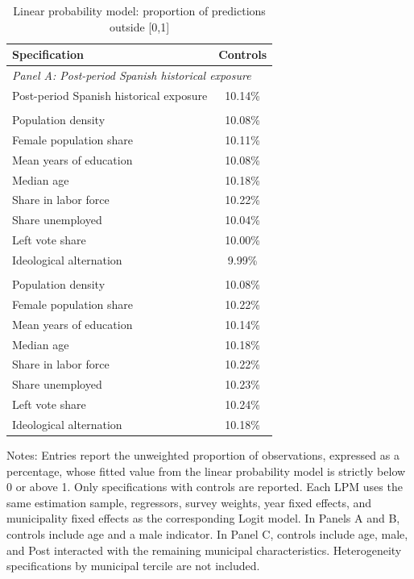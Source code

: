 \begin{table}[!htbp]
\normalsize
\renewcommand{\arraystretch}{1.15}
\centering
\caption{Linear probability model: proportion of predictions outside [0,1]}
\label{tab:lpm_outside_all}
\begin{tabular}{lc}
\hline
Specification & Controls \\
\hline
\multicolumn{2}{l}{\textit{Panel A: Post-period Spanish historical exposure}} \\
Post-period Spanish historical exposure & 10.14\% \\
\addlinespace
\multicolumn{2}{l}{\textit{Panel B: Post-period municipal characteristics}} \\
Population density & 10.08\% \\
Female population share & 10.11\% \\
Mean years of education & 10.08\% \\
Median age & 10.18\% \\
Share in labor force & 10.22\% \\
Share unemployed & 10.04\% \\
Left vote share & 10.00\% \\
Ideological alternation & 9.99\% \\
\addlinespace
\multicolumn{2}{l}{\textit{Panel C: Triple-difference specifications}} \\
Population density & 10.08\% \\
Female population share & 10.22\% \\
Mean years of education & 10.14\% \\
Median age & 10.18\% \\
Share in labor force & 10.22\% \\
Share unemployed & 10.23\% \\
Left vote share & 10.24\% \\
Ideological alternation & 10.18\% \\
\hline
\end{tabular}
\vspace{0.4em}
\begin{minipage}{0.98\textwidth}
\footnotesize Notes: Entries report the unweighted proportion of observations, expressed as a percentage, whose fitted value from the linear probability model is strictly below 0 or above 1. Only specifications with controls are reported. Each LPM uses the same estimation sample, regressors, survey weights, year fixed effects, and municipality fixed effects as the corresponding Logit model. In Panels A and B, controls include age and a male indicator. In Panel C, controls include age, male, and Post interacted with the remaining municipal characteristics. Heterogeneity specifications by municipal tercile are not included.
\end{minipage}
\end{table}
